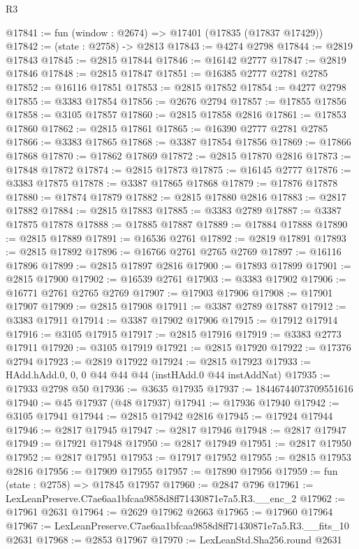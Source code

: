 \begin{lexlean}{R3}
\begin{coremodule}
@17841 := fun (window : @2674) => @17401 (@17835 (@17837 @17429))
@17842 := (state : @2758) -> @2813
@17843 := @4274 @2798
@17844 := @2819 @17843
@17845 := @2815 @17844
@17846 := @16142 @2777
@17847 := @2819 @17846
@17848 := @2815 @17847
@17851 := @16385 @2777 @2781 @2785
@17852 := @16116 @17851
@17853 := @2815 @17852
@17854 := @4277 @2798
@17855 := @3383 @17854
@17856 := @2676 @2794
@17857 := @17855 @17856
@17858 := @3105 @17857
@17860 := @2815 @17858 @2816
@17861 := @17853 @17860
@17862 := @2815 @17861
@17865 := @16390 @2777 @2781 @2785
@17866 := @3383 @17865
@17868 := @3387 @17854 @17856
@17869 := @17866 @17868
@17870 := @17862 @17869
@17872 := @2815 @17870 @2816
@17873 := @17848 @17872
@17874 := @2815 @17873
@17875 := @16145 @2777
@17876 := @3383 @17875
@17878 := @3387 @17865 @17868
@17879 := @17876 @17878
@17880 := @17874 @17879
@17882 := @2815 @17880 @2816
@17883 := @2817 @17882
@17884 := @2815 @17883
@17885 := @3383 @2789
@17887 := @3387 @17875 @17878
@17888 := @17885 @17887
@17889 := @17884 @17888
@17890 := @2815 @17889
@17891 := @16536 @2761
@17892 := @2819 @17891
@17893 := @2815 @17892
@17896 := @16766 @2761 @2765 @2769
@17897 := @16116 @17896
@17899 := @2815 @17897 @2816
@17900 := @17893 @17899
@17901 := @2815 @17900
@17902 := @16539 @2761
@17903 := @3383 @17902
@17906 := @16771 @2761 @2765 @2769
@17907 := @17903 @17906
@17908 := @17901 @17907
@17909 := @2815 @17908
@17911 := @3387 @2789 @17887
@17912 := @3383 @17911
@17914 := @3387 @17902 @17906
@17915 := @17912 @17914
@17916 := @3105 @17915
@17917 := @2815 @17916
@17919 := @3383 @2773 @17911
@17920 := @3105 @17919
@17921 := @2815 @17920
@17922 := @17376 @2794
@17923 := @2819 @17922
@17924 := @2815 @17923
@17933 := HAdd.hAdd.{0, 0, 0} @44 @44 @44 (instHAdd.{0} @44 instAddNat)
@17935 := @17933 @2798 @50
@17936 := @3635 @17935
@17937 := 18446744073709551616
@17940 := @45 @17937 (@48 @17937)
@17941 := @17936 @17940
@17942 := @3105 @17941
@17944 := @2815 @17942 @2816
@17945 := @17924 @17944
@17946 := @2817 @17945
@17947 := @2817 @17946
@17948 := @2817 @17947
@17949 := @17921 @17948
@17950 := @2817 @17949
@17951 := @2817 @17950
@17952 := @2817 @17951
@17953 := @17917 @17952
@17955 := @2815 @17953 @2816
@17956 := @17909 @17955
@17957 := @17890 @17956
@17959 := fun (state : @2758) => @17845 @17957
@17960 := @2847 @796
@17961 := LexLeanPreserve.C7ae6aa1bfcaa9858d8ff71430871e7a5.R3.__enc_2
@17962 := @17961 @2631
@17964 := @2629 @17962 @2663
@17965 := @17960 @17964
@17967 := LexLeanPreserve.C7ae6aa1bfcaa9858d8ff71430871e7a5.R3.__fits_10 @2631
@17968 := @2853 @17967
@17970 := LexLeanStd.Sha256.round @2631

\end{coremodule}
\end{lexlean}
